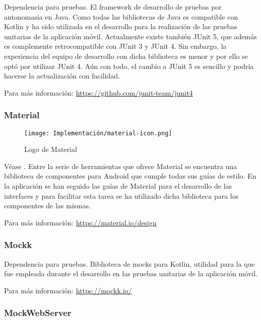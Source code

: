 Dependencia para pruebas. El framework de desarrollo de pruebas por antonomasia en Java. Como todas las bibliotecas de Java es compatible con Kotlin y ha sido utilizada en el desarrollo para la realización de las pruebas unitarias de la aplicación móvil. Actualmente existe también JUnit 5, que además es complemente retrocompatible con JUnit 3 y JUnit 4. Sin embargo, la experiencia del equipo de desarrollo con dicha biblioteca es menor y por ello se optó por utilizar JUnit 4. Aún con todo, el cambio a JUnit 5 es sencillo y podría hacerse la actualización con facilidad.

Para más información: \href{https://github.com/junit-team/junit4}{https://github.com/junit-team/junit4}

\subsubsection{Material}
\label{lib:app:material}

\begin{wrapfigure}[8]{r}{0.2\textwidth}
    \vspace{-25pt}
    \centering
    \texttt{[image: Implementación/material-icon.png]}
    \vspace{-15pt}
    \caption{Logo de Material}
\end{wrapfigure}

Véase . Entre la serie de herramientas que ofrece Material se encuentra una biblioteca de componentes para Android que cumple todas sus guías de estilo. En la aplicación se han seguido las guías de Material para el desarrollo de las interfaces y para facilitar esta tarea se ha utilizado dicha biblioteca para los componentes de las mismas.

Para más información: \href{https://material.io/design}{https://material.io/design}

\subsubsection{Mockk}
\label{lib:app:mockk}

Dependencia para pruebas. Biblioteca de \glspl{mock} para Kotlin, utilidad para la que fue empleada durante el desarrollo en las pruebas unitarias de la aplicación móvil.

Para más información: \href{https://mockk.io/}{https://mockk.io/}

\subsubsection{MockWebServer}
\label{lib:app:mockwebserver}

